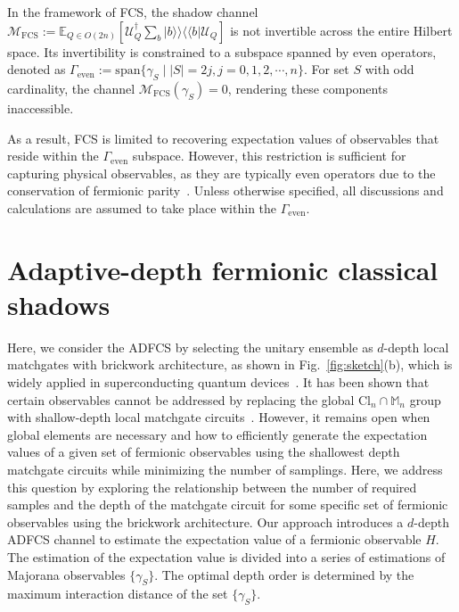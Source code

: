 \documentclass[showpacs,twocolumn,aps,prx,long bibliography,superscriptaddress,notitlepage]{revtex4-1}
\newcommand{\supket}[1]{|#1 \rangle\rangle}
\newcommand{\supbra}[1]{\langle\langle #1 |}
\newcommand{\sbra}[1]{\left[ #1 \right]}
\newcommand{\Ucal}{\mathcal{U}}
\newcommand{\Mbb}{\mathbb{M}}
\newcommand{\Ebb}{\mathbb{E}}
\begin{document}
In the framework of FCS, the shadow channel $\mathcal{M}_{\text{FCS}}:=\Ebb_{Q\in O(2n)}\sbra{\Ucal_{Q}^{\dagger}\sum_{b} \supket{b}\supbra{b} \Ucal_Q}$
is not invertible across the entire Hilbert space.  Its invertibility is constrained to a subspace spanned by even operators, denoted as
$ \Gamma_{\text{even}} := \mathrm{span}\{ \gamma_S \mid |S| = 2j, j=0,1,2,\cdots, n\}.$
For set $S$ with odd cardinality, the channel $\mathcal{M}_{\text{FCS}}(\gamma_S) = 0$, rendering these components inaccessible.


As a result, FCS is limited to recovering expectation values of observables that reside within the $\Gamma_{\text{even}}$ subspace. However, this restriction is sufficient for capturing physical observables, as they are typically even operators due to the conservation of fermionic parity~\cite{turner2011topological}. Unless otherwise specified, all discussions and calculations are assumed to take place within the $\Gamma_{\text{even}}$.



\section{Adaptive-depth fermionic classical shadows}

Here, we consider the ADFCS by selecting the unitary ensemble as $d$-depth local matchgates with brickwork architecture, as shown in Fig.~\ref{fig:sketch}(b), which is widely applied in superconducting quantum devices~\cite{arute2019quantum}. 
It has been shown that certain observables cannot be addressed by replacing the global Cl$_n \cap \Mbb_n$ group with shallow-depth local matchgate circuits~\cite{Zhao21Fermionic}. However, it remains open when global elements are necessary and how to efficiently generate the expectation values of a given set of fermionic observables using the shallowest depth matchgate circuits while minimizing the number of samplings. 
Here, we address this question by exploring the relationship between the number of required samples and the depth of the matchgate circuit for some specific set of fermionic observables using the brickwork architecture. 
{Our approach introduces a $d$-depth ADFCS channel to estimate the expectation value of a fermionic observable $H$. The estimation of the expectation value is divided into a series of estimations of Majorana observables $\{\gamma_S\}$. The optimal depth order is determined by the maximum interaction distance of the set $\{\gamma_S\}$. }
\end{document}
